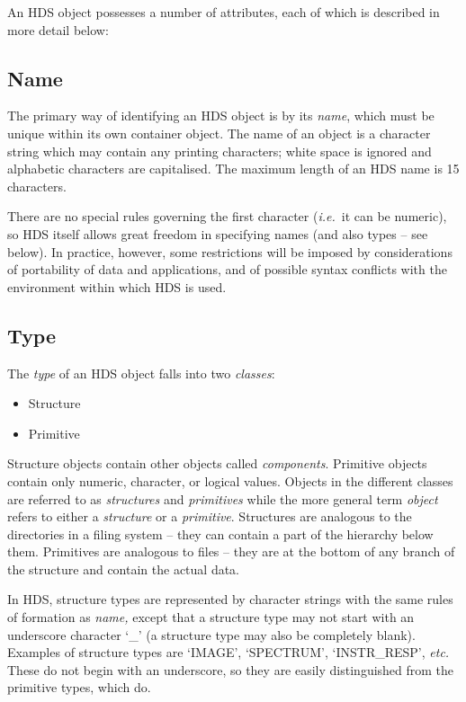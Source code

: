 \documentclass[11pt]{article}
\newcommand{\htmlref}[2]{#1}
\newcommand{\st}[1]{{\em{#1}}}
\begin{document}
An HDS object possesses a number of attributes, each of which is
described in more detail below:

\subsection{\label{sect:name}Name}

The primary way of identifying an HDS object is by its \st{name},
which must be unique within its own container object.  The name of an
object is a character string which may contain any printing
characters; white space is ignored and alphabetic characters are
capitalised. The maximum length of an HDS name is 15 characters.

There are no special rules governing the first character
(\st{i.e.}\ it can be numeric), so HDS itself allows great freedom in specifying
names (and also types -- see \htmlref{below}{sect:type}). In practice,
however, some restrictions will be imposed by considerations of
portability of data and applications, and of possible syntax conflicts
with the environment within which HDS is used.

\subsection{\label{sect:type}Type}

The \st{type} of an HDS object falls into two \st{classes}:

\begin{itemize}
\item Structure
\item Primitive
\end{itemize}

Structure objects contain other objects called
\st{components}. Primitive objects contain only numeric, character, or
logical values. Objects in the different classes are referred to as
\st{structures} and \st{primitives} while the more general term
\st{object} refers to either a \st{structure} or a
\st{primitive}. Structures are analogous to the directories in a
filing system -- they can contain a part of the hierarchy below
them. Primitives are analogous to files -- they are at the bottom of
any branch of the structure and contain the actual data.

In HDS, structure types are represented by character strings with the
same rules of formation as \htmlref{\st{name,}}{sect:name} except that
a structure type may not start with an underscore character `\_' (a
structure type may also be completely blank). Examples of structure
types are `IMAGE', `SPECTRUM', `INSTR\_RESP', \st{etc.} These do not
begin with an underscore, so they are easily distinguished from the
primitive types, which do.
\end{document}
